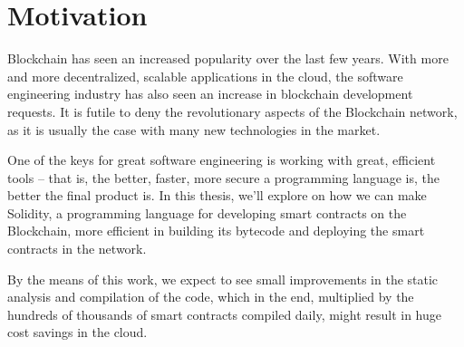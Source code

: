 \chapter*{Motivation} 

Blockchain has seen an increased popularity over the last few years. With more and more decentralized, scalable applications in the cloud, the software engineering industry has also seen an increase in blockchain development requests. It is futile to deny the revolutionary aspects of the Blockchain network, as it is usually the case with many new technologies in the market.

One of the keys for great software engineering is working with great, efficient tools – that is, the better, faster, more secure a programming language is, the better the final product is. In this thesis, we'll explore on how we can make Solidity, a programming language for developing smart contracts on the Blockchain, more efficient in building its bytecode and deploying the smart contracts in the network.

By the means of this work, we expect to see small improvements in the static analysis and compilation of the code, which in the end, multiplied by the hundreds of thousands of smart contracts compiled daily, might result in huge cost savings in the cloud.

